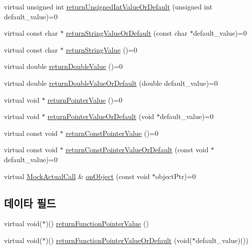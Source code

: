 \begin{DoxyCompactItemize}
\item 
virtual unsigned int \hyperlink{class_mock_actual_call_a94fd7203e1d39976702a97d320a8c4cc}{return\+Unsigned\+Int\+Value\+Or\+Default} (unsigned int default\+\_\+value)=0
\item 
virtual const char $\ast$ \hyperlink{class_mock_actual_call_abd1939d0988c568835f724e13bd182a7}{return\+String\+Value\+Or\+Default} (const char $\ast$default\+\_\+value)=0
\item 
virtual const char $\ast$ \hyperlink{class_mock_actual_call_a80daa9a5f110aa0c7d6dbf2e27c4097c}{return\+String\+Value} ()=0
\item 
virtual double \hyperlink{class_mock_actual_call_ae79064510b836c4d32fdc1c1656f23b8}{return\+Double\+Value} ()=0
\item 
virtual double \hyperlink{class_mock_actual_call_a7d66e994f03c095ba482e6a847757c1d}{return\+Double\+Value\+Or\+Default} (double default\+\_\+value)=0
\item 
virtual void $\ast$ \hyperlink{class_mock_actual_call_a42b79ca9f7c70b819ae78b61897b68b7}{return\+Pointer\+Value} ()=0
\item 
virtual void $\ast$ \hyperlink{class_mock_actual_call_ae9b81e242178b5ac761f2d893ac1e9da}{return\+Pointer\+Value\+Or\+Default} (void $\ast$default\+\_\+value)=0
\item 
virtual const void $\ast$ \hyperlink{class_mock_actual_call_af5a8914480f1d44d6118cf91230fe934}{return\+Const\+Pointer\+Value} ()=0
\item 
virtual const void $\ast$ \hyperlink{class_mock_actual_call_ae4413fb3ce04bec4bf91175f24be823f}{return\+Const\+Pointer\+Value\+Or\+Default} (const void $\ast$default\+\_\+value)=0
\item 
virtual \hyperlink{class_mock_actual_call}{Mock\+Actual\+Call} \& \hyperlink{class_mock_actual_call_a6bef5025448607c237bdffeb49cae588}{on\+Object} (const void $\ast$object\+Ptr)=0
\end{DoxyCompactItemize}
\subsection*{데이타 필드}
\begin{DoxyCompactItemize}
\item 
virtual void($\ast$)() \hyperlink{class_mock_actual_call_abd8adc7ad48025440b2a4aee485f560d}{return\+Function\+Pointer\+Value} ()
\item 
virtual void($\ast$)() \hyperlink{class_mock_actual_call_a01e3ba55118ba079117b1ab3b03d3b0e}{return\+Function\+Pointer\+Value\+Or\+Default} (void($\ast$default\+\_\+value)())
\end{DoxyCompactItemize}


